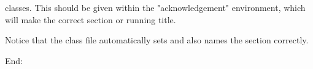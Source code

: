 classes.  This should be given within the "acknowledgement" %
environment, which will make the correct section or running title.


Notice that the class file automatically sets 
and also names the section correctly.










End:

